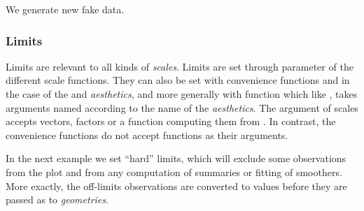 \documentclass[krantz2]{krantz}\usepackage{knitr}
\begin{document}
We generate new fake data.

\begin{knitrout}\footnotesize
{}\color{fgcolor}\begin{kframe}
\begin{alltt}
 \hlkwb{<-}
  \hlstd{(} \hlstd{=} \hlstd{(}\hlstd{(}\hlstd{,}  \hlstd{=} \hlstd{,}  \hlstd{=} \hlstd{),}
                   \hlstd{(}\hlstd{,}  \hlstd{=} \hlstd{,}  \hlstd{=} \hlstd{)),}
              \hlstd{=} \hlstd{(}\hlstd{(}\hlstd{(}\hlstd{,} \hlstd{),} \hlstd{(}\hlstd{,} \hlstd{))),}
              \hlstd{=} \hlstd{(}\hlstd{,}  \hlstd{=} \hlstd{,}  \hlstd{=} \hlstd{))}
\end{alltt}
\end{kframe}
\end{knitrout}
\subsubsection{Limits}

Limits are relevant to all kinds of \emph{scales}. Limits are set through parameter  of the different scale functions. They can also be set with convenience functions  and  in the case of the  and  \emph{aesthetics}, and more generally with function  which like , takes arguments named according to the name of the \emph{aesthetics}. The  argument of scales accepts vectors, factors or a function computing them from . In contrast, the convenience functions do not accept functions as their arguments.

In the next example we set ``hard'' limits, which will exclude some observations from the plot and from any computation of summaries or fitting of smoothers. More exactly, the off-limits observations are converted to  values before they are passed as  to \emph{geometries}.

\begin{knitrout}\footnotesize
{}\color{fgcolor}\begin{kframe}
\begin{alltt}
  \hlopt{+} \hlstd{()} \hlopt{+}
  \hlstd{(} \hlstd{=} \hlstd{(}\hlstd{,} \hlstd{))}
\end{alltt}
\end{kframe}
\end{knitrout}
\end{document}
